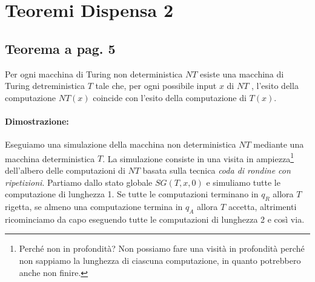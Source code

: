 \section{Teoremi Dispensa 2}

\subsection{Teorema a pag. 5}
Per ogni macchina di Turing non deterministica $NT$ esiste una macchina di Turing detreministica $T$
tale che, per ogni possibile input $x$ di $NT$ , l'esito della computazione $NT(x)$ coincide con l'esito della computazione
di $T(x)$.

\paragraph*{Dimostrazione:}
Eseguiamo una simulazione della macchina non deterministica $NT$ mediante una macchina deterministica $T$. La simulazione consiste 
in una visita in ampiezza\footnote{Perché non in profondità? Non possiamo fare una visità in profondità perché non sappiamo la lunghezza di ciascuna computazione, in quanto potrebbero
anche non finire.} dell'albero delle computazioni di $NT$ basata sulla tecnica \textit{coda di rondine con ripetizioni}.
Partiamo dallo stato globale $SG(T, x, 0)$ e simuliamo tutte le computazione di lunghezza 1. Se tutte le computazioni terminano in 
$q_{R}$ allora $T$ rigetta, se almeno una computazione termina in $q_{A}$ allora $T$ accetta, altrimenti ricominciamo da capo 
eseguendo tutte le computazioni di lunghezza 2 e così via.